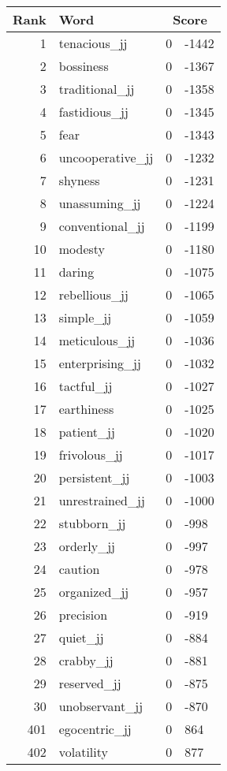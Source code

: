 \begin{longtable}[!htbp]{| rlr@{.}l |}
    \hline
    \textbf{Rank} & \textbf{Word} & \multicolumn{2}{c|}{\textbf{Score}} \\
    \hline
    \endhead
    1 & tenacious\_jj & 0 & -1442 \\
    2 & bossiness & 0 & -1367 \\
    3 & traditional\_jj & 0 & -1358 \\
    4 & fastidious\_jj & 0 & -1345 \\
    5 & fear & 0 & -1343 \\
    6 & uncooperative\_jj & 0 & -1232 \\
    7 & shyness & 0 & -1231 \\
    8 & unassuming\_jj & 0 & -1224 \\
    9 & conventional\_jj & 0 & -1199 \\
    10 & modesty & 0 & -1180 \\
    11 & daring & 0 & -1075 \\
    12 & rebellious\_jj & 0 & -1065 \\
    13 & simple\_jj & 0 & -1059 \\
    14 & meticulous\_jj & 0 & -1036 \\
    15 & enterprising\_jj & 0 & -1032 \\
    16 & tactful\_jj & 0 & -1027 \\
    17 & earthiness & 0 & -1025 \\
    18 & patient\_jj & 0 & -1020 \\
    19 & frivolous\_jj & 0 & -1017 \\
    20 & persistent\_jj & 0 & -1003 \\
    21 & unrestrained\_jj & 0 & -1000 \\
    22 & stubborn\_jj & 0 & -998 \\
    23 & orderly\_jj & 0 & -997 \\
    24 & caution & 0 & -978 \\
    25 & organized\_jj & 0 & -957 \\
    26 & precision & 0 & -919 \\
    27 & quiet\_jj & 0 & -884 \\
    28 & crabby\_jj & 0 & -881 \\
    29 & reserved\_jj & 0 & -875 \\
    30 & unobservant\_jj & 0 & -870 \\
    401 & egocentric\_jj & 0 & 864 \\
    402 & volatility & 0 & 877 \\

\end{longtable}
